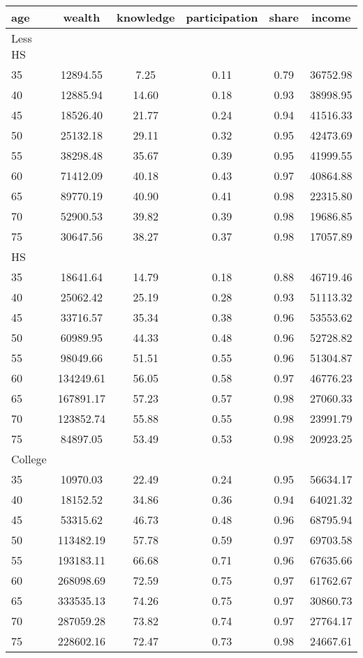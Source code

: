  \begin{tabular}{lccccc}
 \hline \hline
  age & wealth & knowledge & participation & share & income \\
 \hline
 Less HS & & & & & \\
 \hline
35 &  12894.55 &      7.25 &      0.11 &      0.79 &  36752.98 \\ 
40 &  12885.94 &     14.60 &      0.18 &      0.93 &  38998.95 \\ 
45 &  18526.40 &     21.77 &      0.24 &      0.94 &  41516.33 \\ 
50 &  25132.18 &     29.11 &      0.32 &      0.95 &  42473.69 \\ 
55 &  38298.48 &     35.67 &      0.39 &      0.95 &  41999.55 \\ 
60 &  71412.09 &     40.18 &      0.43 &      0.97 &  40864.88 \\ 
65 &  89770.19 &     40.90 &      0.41 &      0.98 &  22315.80 \\ 
70 &  52900.53 &     39.82 &      0.39 &      0.98 &  19686.85 \\ 
75 &  30647.56 &     38.27 &      0.37 &      0.98 &  17057.89 \\ 
 \hline
 HS & & & & & \\
 \hline
35 &  18641.64 &     14.79 &      0.18 &      0.88 &  46719.46 \\ 
40 &  25062.42 &     25.19 &      0.28 &      0.93 &  51113.32 \\ 
45 &  33716.57 &     35.34 &      0.38 &      0.96 &  53553.62 \\ 
50 &  60989.95 &     44.33 &      0.48 &      0.96 &  52728.82 \\ 
55 &  98049.66 &     51.51 &      0.55 &      0.96 &  51304.87 \\ 
60 & 134249.61 &     56.05 &      0.58 &      0.97 &  46776.23 \\ 
65 & 167891.17 &     57.23 &      0.57 &      0.98 &  27060.33 \\ 
70 & 123852.74 &     55.88 &      0.55 &      0.98 &  23991.79 \\ 
75 &  84897.05 &     53.49 &      0.53 &      0.98 &  20923.25 \\ 
 \hline
 College & & & & & \\
 \hline
35 &  10970.03 &     22.49 &      0.24 &      0.95 &  56634.17 \\ 
40 &  18152.52 &     34.86 &      0.36 &      0.94 &  64021.32 \\ 
45 &  53315.62 &     46.73 &      0.48 &      0.96 &  68795.94 \\ 
50 & 113482.19 &     57.78 &      0.59 &      0.97 &  69703.58 \\ 
55 & 193183.11 &     66.68 &      0.71 &      0.96 &  67635.66 \\ 
60 & 268098.69 &     72.59 &      0.75 &      0.97 &  61762.67 \\ 
65 & 333535.13 &     74.26 &      0.75 &      0.97 &  30860.73 \\ 
70 & 287059.28 &     73.82 &      0.74 &      0.97 &  27764.17 \\ 
75 & 228602.16 &     72.47 &      0.73 &      0.98 &  24667.61 \\ 
 \hline \hline
 \end{tabular}
